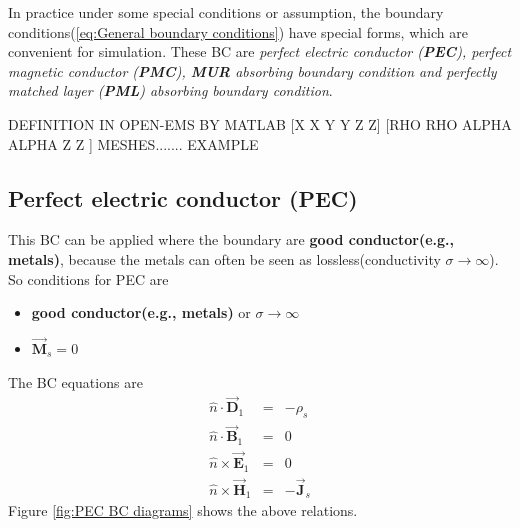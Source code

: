     In practice  under some special conditions or assumption, the boundary conditions(\ref{eq:General boundary conditions}) have  special forms, which are convenient for simulation. These BC are \textit{perfect electric conductor (\textbf{PEC}), perfect magnetic conductor (\textbf{PMC}), \textbf{MUR} absorbing boundary condition and perfectly matched layer (\textbf{PML}) absorbing boundary condition}.

     DEFINITION IN OPEN-EMS BY MATLAB [X X Y Y Z Z] [RHO RHO ALPHA ALPHA Z Z ]
     MESHES.......
     EXAMPLE
\subsection{Perfect electric conductor (PEC)}
This BC can be applied where the boundary are \textbf{good conductor(e.g., metals)}, because the metals can often be seen as lossless(conductivity $\sigma\rightarrow\infty$). So conditions for PEC are
\begin{itemize}
 \item \textbf{good conductor(e.g., metals)} or $\sigma\rightarrow\infty$
 \item $\vec{\mathbf{M}}_s=0$
\end{itemize}
The BC equations are
	\begin{eqnarray}
	    \hat{n}\cdot\vec{\mathbf{D}}_1 &=&-\rho_s  \\
	    \hat{n}\cdot\vec{\mathbf{B}}_1 &=&0  \\
	    \hat{n}\times\vec{\mathbf{E}}_1 &=&0\\
	    \hat{n}\times\vec{\mathbf{H}}_1 &=&-\vec{\mathbf{J}}_s
	    \label{eq:PEC boundary conditions}
	\end{eqnarray}
    Figure  \ref{fig:PEC BC diagrams} shows the above relations.
